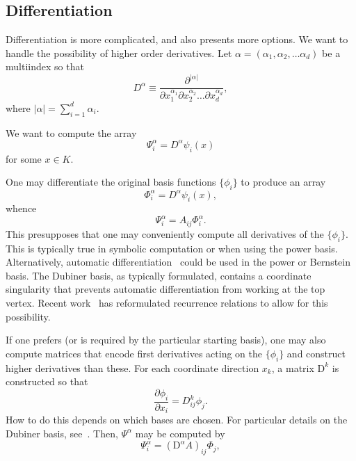 \subsection{Differentiation}
Differentiation is more complicated, and also presents more options.
We want to handle the possibility of higher order derivatives. Let
\( \alpha = ( \alpha_1 , \alpha_2 , \dots \alpha_d ) \) be a
multiindex so that
\[
D^\alpha \equiv \frac{\partial^{|\alpha|}}{\partial
  x_1^{\alpha_1} \partial x_2^{\alpha_2} \dots \partial x_d^{\alpha_d}},
\]
where \( |\alpha| = \sum_{i=1}^{d} \alpha_i \).

We want to compute the array
\[
\Psi^\alpha_i = D^\alpha \psi_i(x)
\]
for some \( x \in K \).

One may differentiate the
original basis functions \( \{ \phi_i \} \) to produce an array
\[
\Phi^\alpha_i = D^\alpha \psi_i(x),
\]
whence
\[
\Psi^\alpha_i = A_{ij} \Phi^\alpha_i.
\]
This presupposes that one may conveniently compute all derivatives of
the \( \{ \phi_i \} \).  This is typically true in symbolic
computation or when using the power basis.  Alternatively, automatic
differentiation~\cite{} could be used in the power or Bernstein basis.
The Dubiner basis, as typically formulated, contains a coordinate
singularity that prevents automatic differentiation from working at
the top vertex.  Recent work~\cite{} has reformulated recurrence
relations to allow for this possibility.  

If one prefers (or is required by the particular starting basis), one
may also compute matrices that encode first derivatives acting on the
\( \{ \phi_i \} \) and construct higher derivatives than these.
For each coordinate direction \( x_k \), a matrix \( \mathrm{D}^k \)
is constructed so that 
\[
\frac{\partial \phi_i}{\partial x_i} =
D^k_{ij} \phi_j.
\]
How to do this depends on which bases are chosen.  For particular
details on the Dubiner basis, see~\cite{}.  Then, \( \Psi^\alpha \)
may be computed by 
\[
\Psi^\alpha_i = (\mathrm{D}^\alpha A)_{ij} \Phi_{j},
\]

